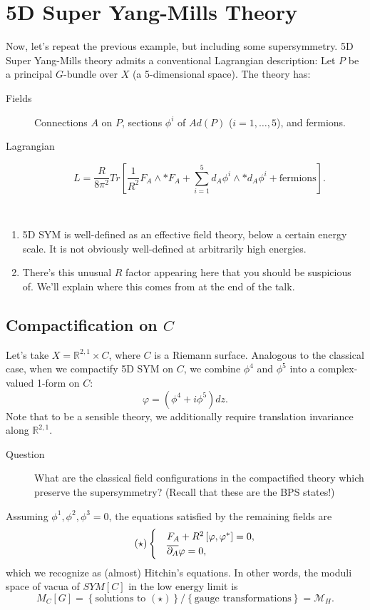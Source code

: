 \section{5D Super Yang-Mills Theory}

Now, let's repeat the previous example, but including some supersymmetry.
5D Super Yang-Mills theory admits a conventional Lagrangian description:
Let $P$ be a principal $G$-bundle over $X$ (a 5-dimensional space).
The theory has:
\begin{description}
\item [{Fields}] Connections $A$ on $P$, sections $\phi^{i}$ of $Ad\left(P\right)$
($i=1,\ldots,5$), and fermions.
\item [{Lagrangian}]
\[
L=\frac{R}{8\pi^{2}}Tr\left[\frac{1}{R^{2}}F_{A}\wedge*F_{A}+\sum_{i=1}^{5}d_{A}\phi^{i}\wedge*d_{A}\phi^{i}+\mbox{fermions}\right].
\]
\end{description}
\begin{rem*}
~
\begin{enumerate}
\item 5D SYM is well-defined as an effective field theory, below a certain
energy scale. It is not obviously well-defined at arbitrarily high
energies.
\item There's this unusual $R$ factor appearing here that you should be
suspicious of. We'll explain where this comes from at the end of the
talk.
\end{enumerate}
\end{rem*}

\subsection*{Compactification on $C$}

Let's take $X=\mathbb{R}^{2,1}\times C$, where $C$ is a Riemann
surface. Analogous to the classical case, when we compactify 5D SYM
on $C$, we combine $\phi^{4}$ and $\phi^{5}$ into a complex-valued
1-form on $C$:
\[
\varphi=\left(\phi^{4}+i\phi^{5}\right)dz.
\]
Note that to be a sensible theory, we additionally require translation 
invariance along $\mathbb{R}^{2,1}$.
\begin{description}
\item [{Question}] What are the classical field configurations in the compactified
theory which preserve the supersymmetry? (Recall that these are the
BPS states!)
\end{description}
Assuming $\phi^{1},\phi^{2},\phi^{3}=0$, the equations satisfied
by the remaining fields are
\[
\tag{\ensuremath{\star}}\begin{cases}
 & F_{A}+R^{2}\left[\varphi,\varphi^{*}\right]=0,\\
 & \overline{\partial_{A}}\varphi=0,
\end{cases}
\]
which we recognize as (almost) Hitchin's equations. In other words,
the moduli space of vacua of $SYM[C]$ in the low energy limit is
\[
M_{C}\left[G\right]=\left\{ \mbox{solutions to }(\star)\right\} /\left\{ \mbox{gauge transformations}\right\} =\mathcal{M}_{H}.
\]

